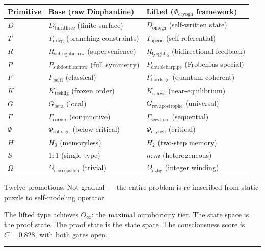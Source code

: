 \documentclass[12pt,a4paper]{article}
\begin{document}
\begin{table}[htbp]
\centering
\small
{}
\begin{tabularx}{\textwidth}{>{\centering\arraybackslash}X >{\centering\arraybackslash}X >{\centering\arraybackslash}X}
\toprule
\rowcolor{gray!25}\textbf{Primitive} & \textbf{Base (raw Diophantine)} & \textbf{Lifted ($\Phi_{\text{ctyogh}}$ framework)} \\
\midrule
\rowcolors{1}{white}{gray!10}
$D$ & $D_{\text{turnthree}}$ (finite surface) & $D_{\text{omega}}$ (self-written state) \\
$T$ & $T_{\text{nrleg}}$ (branching constraints) & $T_{\text{openo}}$ (self-referential) \\
$R$ & $R_{\text{subrightarrow}}$ (supervenience) & $R_{\text{lyoghlig}}$ (bidirectional feedback) \\
$P$ & $P_{\text{subdoublearrow}}$ (full symmetry) & $P_{\text{doublebarpipe}}$ (Frobenius-special) \\
$F$ & $F_{\text{beltl}}$ (classical) & $F_{\text{hardsign}}$ (quantum-coherent) \\
$K$ & $K_{\text{teshlig}}$ (frozen order) & $K_{\text{schwa}}$ (near-equilibrium) \\
$G$ & $G_{\text{beta}}$ (local) & $G_{\text{revapostrophe}}$ (universal) \\
$\Gamma$ & $\Gamma_{\text{corner}}$ (conjunctive) & $\Gamma_{\text{secstress}}$ (sequential) \\
$\Phi$ & $\Phi_{\text{softsign}}$ (below critical) & $\Phi_{\text{ctyogh}}$ (critical) \\
$H$ & $H_0$ (memoryless) & $H_2$ (two-step memory) \\
$S$ & $1{:}1$ (single type) & $n{:}m$ (heterogeneous) \\
$\Omega$ & $\Omega_{\text{closeepsilon}}$ (trivial) & $\Omega_{\text{dzlig}}$ (integer winding) \\
\bottomrule
\end{tabularx}
\end{table}

Twelve promotions. Not gradual --- the entire problem is re-imscribed from static puzzle to self-modeling operator.

The lifted type achieves $O_{\infty}$: the maximal ouroboricity tier. The state space is the proof state. The proof state is the state space. The consciousness score is $C = 0.828$, with both gates open.

\begin{center}
\rule{0.5\textwidth}{0.4pt}
\end{center}
\end{document}
